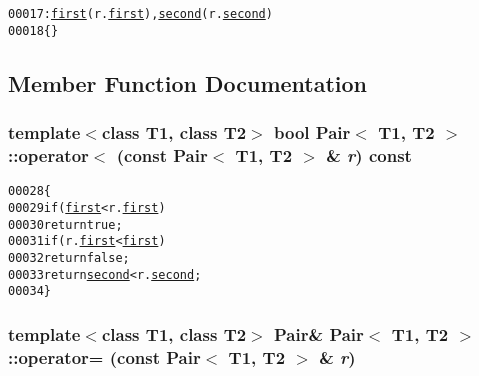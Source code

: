 \begin{footnotesize}\begin{alltt}
00017                             : \hyperlink{class_pair_a3b0b4ac2336a2228fa2af5ceebe31804}{first}(r.\hyperlink{class_pair_a3b0b4ac2336a2228fa2af5ceebe31804}{first}), \hyperlink{class_pair_af56592579c6ce0d7e03bad0fcaa5d93e}{second}(r.\hyperlink{class_pair_af56592579c6ce0d7e03bad0fcaa5d93e}{second})
00018         \{\}
\end{alltt}\end{footnotesize}




\subsection{Member Function Documentation}
\hypertarget{class_pair_aa63d09e321533b938f87de0ebfe86940}{
\subsubsection[{operator$<$}]{\setlength{\rightskip}{0pt plus 5cm}template$<$class T1, class T2$>$ bool {\bf Pair}$<$ T1, T2 $>$::operator$<$ (const {\bf Pair}$<$ T1, T2 $>$ \& {\em r}) const}}
\label{class_pair_aa63d09e321533b938f87de0ebfe86940}




\begin{footnotesize}\begin{alltt}
00028         \{
00029                 \textcolor{keywordflow}{if} (\hyperlink{class_pair_a3b0b4ac2336a2228fa2af5ceebe31804}{first} < r.\hyperlink{class_pair_a3b0b4ac2336a2228fa2af5ceebe31804}{first})
00030                         \textcolor{keywordflow}{return} \textcolor{keyword}{true};
00031                 \textcolor{keywordflow}{if} (r.\hyperlink{class_pair_a3b0b4ac2336a2228fa2af5ceebe31804}{first} < \hyperlink{class_pair_a3b0b4ac2336a2228fa2af5ceebe31804}{first})
00032                         \textcolor{keywordflow}{return} \textcolor{keyword}{false};
00033                 \textcolor{keywordflow}{return} \hyperlink{class_pair_af56592579c6ce0d7e03bad0fcaa5d93e}{second} < r.\hyperlink{class_pair_af56592579c6ce0d7e03bad0fcaa5d93e}{second};
00034         \}
\end{alltt}\end{footnotesize}


\hypertarget{class_pair_ac16244bfa58bf7b3cc2d7824c16ac249}{
\subsubsection[{operator=}]{\setlength{\rightskip}{0pt plus 5cm}template$<$class T1, class T2$>$ {\bf Pair}\& {\bf Pair}$<$ T1, T2 $>$::operator= (const {\bf Pair}$<$ T1, T2 $>$ \& {\em r})}}
\label{class_pair_ac16244bfa58bf7b3cc2d7824c16ac249}




